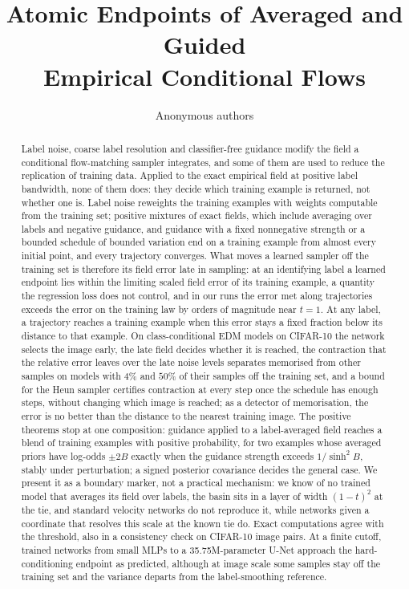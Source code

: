 \documentclass{article} %
\title{Atomic Endpoints of Averaged and Guided\\
Empirical Conditional Flows}
\author{Anonymous authors}
\theoremstyle{plain}
\theoremstyle{definition}
\theoremstyle{remark}
\begin{document}
\maketitle
\raggedbottom

\begin{abstract}
Label noise, coarse label resolution and classifier-free guidance modify the field a conditional
flow-matching sampler integrates, and some of them are used to reduce the replication of training
data. Applied to the exact empirical field at positive label bandwidth, none of them does: they
decide which training example is returned, not whether one is. Label noise reweights the training
examples with weights computable from the training set; positive mixtures of exact fields, which
include averaging over labels and negative guidance, and guidance with a fixed nonnegative strength
or a bounded schedule of bounded variation end on a training example from almost every initial
point, and every trajectory converges. What moves a learned sampler off the training set is
therefore its field error late in sampling: at an identifying label a learned endpoint lies within
the limiting scaled field error of its training example, a quantity the regression loss does not
control, and in our runs the error met along trajectories exceeds the error on the training law by
orders of magnitude near $t=1$. At any label, a trajectory reaches a training example when this
error stays a fixed fraction below its distance to that example. On class-conditional EDM models
on CIFAR-10 the network selects the image early, the late field decides whether it is reached, the
contraction that the relative error leaves over the late noise levels separates memorised from
other samples on models with $4\%$ and $50\%$ of their samples off the training set, and a bound
for the Heun sampler certifies contraction at every step once the schedule has enough steps,
without changing which image is reached; as a detector of
memorisation, the error is no better than the distance to the nearest training image. The positive
theorems stop at one composition: guidance applied to a label-averaged field reaches a blend of
training examples with positive probability, for two examples whose averaged priors have log-odds
$\pm2B$ exactly when the guidance strength exceeds $1/\sinh^2B$, stably under perturbation; a signed
posterior covariance decides the general case. We present it as a boundary marker, not a practical
mechanism: we know of no trained model that averages its field over labels, the basin sits in a
layer of width $(1-t)^2$ at the tie, and standard velocity networks do not reproduce it, while
networks given a coordinate that resolves this scale at the known tie do. Exact computations agree
with the threshold, also in a consistency check on CIFAR-10 image pairs. At a finite cutoff,
trained networks from small MLPs to a 35.75M-parameter U-Net approach the hard-conditioning
endpoint as predicted, although at image scale some samples stay off the training set and the
variance departs from the label-smoothing reference.
\end{abstract}
\end{document}
